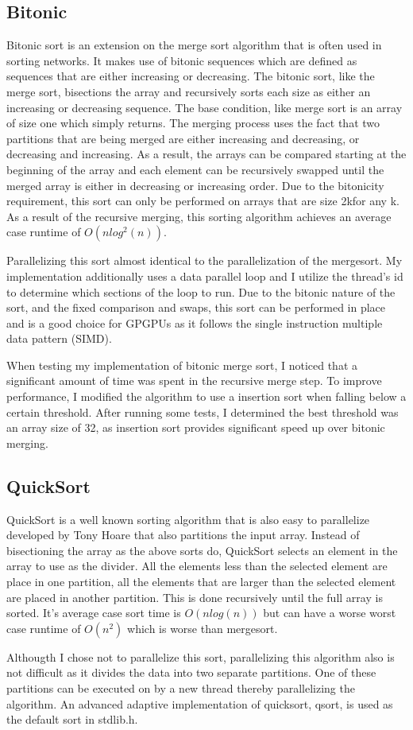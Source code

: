 \documentclass[11pt,letterpaper]{article}
\begin{document}
\subsection{Bitonic}
Bitonic sort is an extension on the merge sort algorithm that is often used in
sorting networks.  It makes use of bitonic sequences which are defined as
sequences that are either increasing or decreasing.  The bitonic sort, like the
merge sort, bisections the array and recursively sorts each size as either an
increasing or decreasing sequence.  The base condition, like merge sort is an
array of size one which simply returns.  The merging process uses the fact that
two partitions that are being merged are either increasing and decreasing, or
decreasing and increasing.  As a result, the arrays can be compared starting at
the beginning of the array and each element can be recursively swapped until the
merged array is either in decreasing or increasing order.  Due to the bitonicity
requirement, this sort can only be performed on arrays that are size 2kfor any
k.  As a result of the recursive merging, this sorting algorithm achieves an
average case runtime of $O(n log^2(n))$.
\par
Parallelizing this sort almost identical to the parallelization of the
mergesort.  My implementation additionally uses a data parallel loop and I
utilize the thread’s id to determine which sections of the loop to run. Due to
the bitonic nature of the sort, and the fixed comparison and swaps, this sort
can be performed in place and is a good choice for GPGPUs as it follows the
single instruction multiple data pattern (SIMD).
\par
When testing my implementation of bitonic merge sort, I noticed that a 
significant amount of time was spent in the recursive merge step.  To improve
performance, I modified the algorithm to use a insertion sort when falling below
a certain threshold.  After running some tests, I determined the best threshold
was an array size of 32, as insertion sort provides significant speed up over
bitonic merging.

\subsection{QuickSort}
QuickSort is a well known sorting algorithm that is also easy to parallelize
developed by Tony Hoare that also partitions the input array.  Instead of
bisectioning the array as the above sorts do, QuickSort selects an element in
the array to use as the divider.  All the elements less than the selected
element are place in one partition, all the elements that are larger than the
selected element are placed in another partition.  This is done recursively
until the full array is sorted.  It’s average case sort time is 
$O(n log(n))$ but can have a worse worst case runtime of $O(n^2)$ which is worse
than mergesort.
\par
Althougth I chose not to parallelize this sort, parallelizing this algorithm also is not difficult as it divides the data into
two separate partitions. One of these partitions can be executed on by a new
thread thereby parallelizing the algorithm.   An advanced adaptive
implementation of quicksort, qsort, is used as the default sort in stdlib.h.
\end{document}
